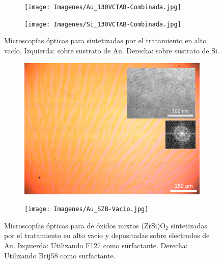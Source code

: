 		 \begin{figure}
		 	   	    \begin{subfigure}{0.495\textwidth}
			       	\texttt{[image: Imagenes/Au\_130VCTAB-Combinada.jpg]}
			   		\end{subfigure}
			   		\begin{subfigure}{0.495\textwidth}
			   	    \texttt{[image: Imagenes/Si\_130VCTAB-Combinada.jpg]}
			   		\end{subfigure}
					 \caption[Microscopía óptica \pdmC\space tratamiento vacío.]{Microscopías ópticas para \pdmC\space sintetizadas por el tratamiento en alto vacío. Izquierda: sobre sustrato de Au. Derecha: sobre sustrato de Si.}
					 \label{fig:Microscopia_CTAB_vacio}	
				     \end{figure}		 	    

		  \begin{figure}
		 	   	    \begin{subfigure}{0.495\textwidth}
			       	\includegraphics[width=\textwidth]{Imagenes/Au_SZF-Vacio.jpg}
			   		\end{subfigure}
			   		\begin{subfigure}{0.495\textwidth}
			   	    \texttt{[image: Imagenes/Au\_SZB-Vacio.jpg]}
			   		\end{subfigure}
					 \caption[Microscopía óptica \pdm\space mixtas Zr/Si.]{Microscopías ópticas para \pdm\space de óxidos mixtos (Zr\textbar Si)O$_2$ sintetizadas por el tratamiento en alto vacío y depositadas sobre electrodos de Au. Izquierda: Utilizando F127 como surfactante. Derecha: Utilizando Brij58 como surfactante.}
					 \label{fig:Microscopia_ZrSi_vacio}	
				     \end{figure}

